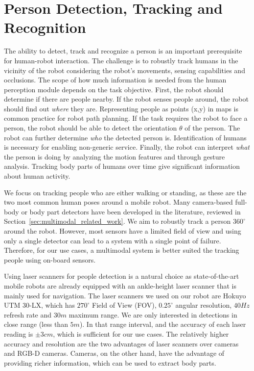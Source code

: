 \chapter{Person Detection, Tracking and Recognition}
\label{chapter:multimodal_person_detection_and_tracking}
The ability to detect, track and recognize a person is an important prerequisite for human-robot interaction. The challenge is to robustly track humans in the vicinity of the robot considering the robot's movements, sensing capabilities and occlusions. The scope of how much information is needed from the human perception module depends on the task objective. First, the robot should determine if there are people nearby. If the robot senses people around, the robot should find out \emph{where} they are. Representing people as points (x,y) in maps is common practice for robot path planning. If the task requires the robot to face a person, the robot should be able to detect the orientation $\theta$ of the person. The robot can further determine \emph{who} the detected person is. Identification of humans is necessary for enabling non-generic service. Finally, the robot can interpret \emph{what} the person is doing by analyzing the motion features and through gesture analysis. Tracking body parts of humans over time give significant information about human activity.

We focus on tracking people who are either walking or standing, as these are the two most common human poses around a mobile robot. Many camera-based full-body or body part detectors have been developed in the literature, reviewed in Section~\ref{sec:multimodal_related_work}. We aim to robustly track a person $360^{\circ}$ around the robot. However, most sensors have a limited field of view and using only a single detector can lead to a system with a single point of failure. Therefore, for our use cases, a multimodal system is better suited the tracking people using on-board sensors. 

Using laser scanners for people detection is a natural choice as state-of-the-art mobile robots are already equipped with an ankle-height laser scanner that is mainly used for navigation. The laser scanners we used on our robot are Hokuyo UTM 30-LX, which has $270^{\circ}$ Field of View (FOV), $0.25^{\circ}$ angular resolution, $40Hz$ refresh rate and $30m$ maximum range. We are only interested in detections in close range (less than $5m$). In that range interval, and the accuracy of each laser reading is $\pm 3cm$, which is sufficient for our use cases. The relatively higher accuracy and resolution are the two advantages of laser scanners over cameras and RGB-D cameras. Cameras, on the other hand, have the advantage of providing richer information, which can be used to extract body parts. 

